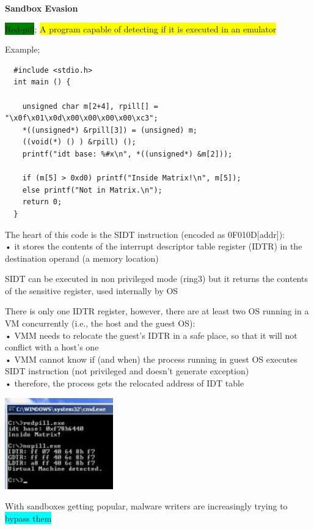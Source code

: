 \documentclass[]{project_plan}
\begin{document}
\textbf{Sandbox Evasion}

\colorbox{green}{Red-pill}; \colorbox{yellow}{A program capable of detecting if it is executed in an emulator}

Example;
\begin{lstlisting}
  #include <stdio.h>
  int main () {

    unsigned char m[2+4], rpill[] = "\x0f\x01\x0d\x00\x00\x00\x00\xc3";
    *((unsigned*) &rpill[3]) = (unsigned) m;
    ((void(*) () ) &rpill) ();
    printf("idt base: %#x\n", *((unsigned*) &m[2]));

    if (m[5] > 0xd0) printf("Inside Matrix!\n", m[5]);
    else printf("Not in Matrix.\n");
    return 0;
  }
\end{lstlisting}
The heart of this code is the SIDT instruction (encoded as 0F010D[addr]):\\
• it stores the contents of the interrupt descriptor table register (IDTR) in the destination operand (a
memory location)

SIDT can be executed in non privileged mode (ring3) but it returns the contents of the
sensitive register, used internally by OS

There is only one IDTR register, however, there are at least two OS running in a VM concurrently
(i.e., the host and the guest OS):\\
• VMM needs to relocate the guest’s IDTR in a safe place, so that it will not conflict with a host’s one\\
• VMM cannot know if (and when) the process running in guest OS executes SIDT instruction (not
privileged and doesn’t generate exception)\\
• therefore, the process gets the relocated address of IDT table

\includegraphics[width=.5\linewidth]{redpill.png}

With sandboxes getting popular, malware writers are increasingly trying to \colorbox{cyan}{bypass them}
\end{document}
